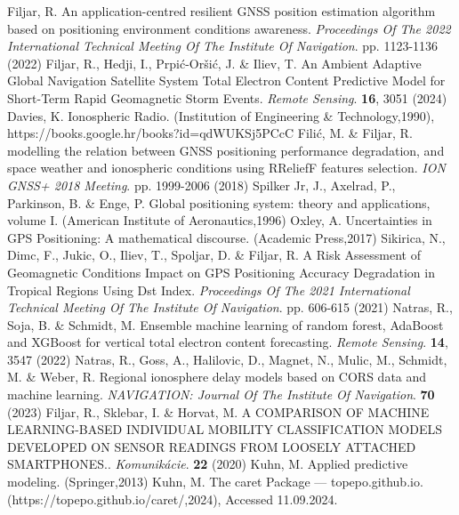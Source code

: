 \documentclass[sn-mathphys-num]{sn-jnl}%
\begin{document}
\begin{thebibliography}{000}
Filjar, R. An application-centred resilient GNSS position estimation algorithm based on positioning environment conditions awareness. {\em Proceedings Of The 2022 International Technical Meeting Of The Institute Of Navigation}. pp. 1123-1136 (2022)
Filjar, R., Hedji, I., Prpić-Oršić, J. \& Iliev, T. An Ambient Adaptive Global Navigation Satellite System Total Electron Content Predictive Model for Short-Term Rapid Geomagnetic Storm Events. {\em Remote Sensing}. \textbf{16}, 3051 (2024)
Davies, K. Ionospheric Radio. (Institution of Engineering & Technology,1990), https://books.google.hr/books?id=qdWUKSj5PCcC
Filić, M. \& Filjar, R. modelling the relation between GNSS positioning performance degradation, and space weather and ionospheric conditions using RReliefF features selection. {\em ION GNSS+ 2018 Meeting}. pp. 1999-2006 (2018)
Spilker Jr, J., Axelrad, P., Parkinson, B. \& Enge, P. Global positioning system: theory and applications, volume I. (American Institute of Aeronautics,1996)
Oxley, A. Uncertainties in GPS Positioning: A mathematical discourse. (Academic Press,2017)
Sikirica, N., Dimc, F., Jukic, O., Iliev, T., Spoljar, D. \& Filjar, R. A Risk Assessment of Geomagnetic Conditions Impact on GPS Positioning Accuracy Degradation in Tropical Regions Using Dst Index. {\em Proceedings Of The 2021 International Technical Meeting Of The Institute Of Navigation}. pp. 606-615 (2021)
Natras, R., Soja, B. \& Schmidt, M. Ensemble machine learning of random forest, AdaBoost and XGBoost for vertical total electron content forecasting. {\em Remote Sensing}. \textbf{14}, 3547 (2022)
Natras, R., Goss, A., Halilovic, D., Magnet, N., Mulic, M., Schmidt, M. \& Weber, R. Regional ionosphere delay models based on CORS data and machine learning. {\em NAVIGATION: Journal Of The Institute Of Navigation}. \textbf{70} (2023)
Filjar, R., Sklebar, I. \& Horvat, M. A COMPARISON OF MACHINE LEARNING-BASED INDIVIDUAL MOBILITY CLASSIFICATION MODELS DEVELOPED ON SENSOR READINGS FROM LOOSELY ATTACHED SMARTPHONES.. {\em Komunikácie}. \textbf{22} (2020)
Kuhn, M. Applied predictive modeling. (Springer,2013)
Kuhn, M. The caret Package — topepo.github.io. (https://topepo.github.io/caret/,2024), Accessed 11.09.2024.

\end{thebibliography}
\end{document}
